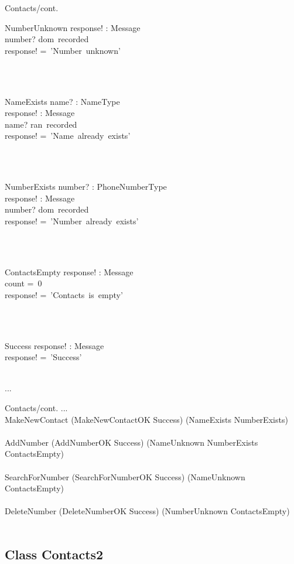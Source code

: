 \documentclass[12pt]{article}
\begin{document}
\begin{spacing}{1.5}
\begin{class}{Contacts/cont.}
\begin{op}{NumberUnknown}
response! : Message\\
\ST
number? \notin dom~recorded\\
response! =~'Number~unknown'
\end{op}\\
\\
\begin{op}{NameExists}
name? : NameType\\
response! : Message\\
\ST
name? \in ran~recorded\\
response! =~'Name~already~exists'
\end{op}\\
\\
\begin{op}{NumberExists}
number? : PhoneNumberType\\
response! : Message\\
\ST
number? \in dom~recorded\\
response! =~'Number~already~exists'
\end{op}\\
\\
\begin{op}{ContactsEmpty}
response! : Message\\
\ST
count =~0\\
response! =~'Contacts~is~empty'
\end{op}\\
\\
\begin{op}{Success}
response! : Message\\
\ST
response! =~'Success'
\end{op}\\
...
\end{class}
\newpage
\begin{class}{Contacts/cont.}
...
\also
\mbox{}\\
MakeNewContact \sdef (MakeNewContactOK \land Success) \oplus (NameExists \lor NumberExists)  \\
\mbox{}\\
AddNumber \sdef (AddNumberOK \land Success) \oplus (NameUnknown \lor NumberExists \lor ContactsEmpty)  \\
\mbox{}\\
SearchForNumber \sdef (SearchForNumberOK \land Success) \oplus (NameUnknown \lor ContactsEmpty)  \\
\mbox{}\\
DeleteNumber \sdef (DeleteNumberOK \land Success) \oplus (NumberUnknown \lor ContactsEmpty)  \\
\mbox{}\\
\end{class}
\newpage
\subsection{Class Contacts2}


\end{spacing}
\end{document}
